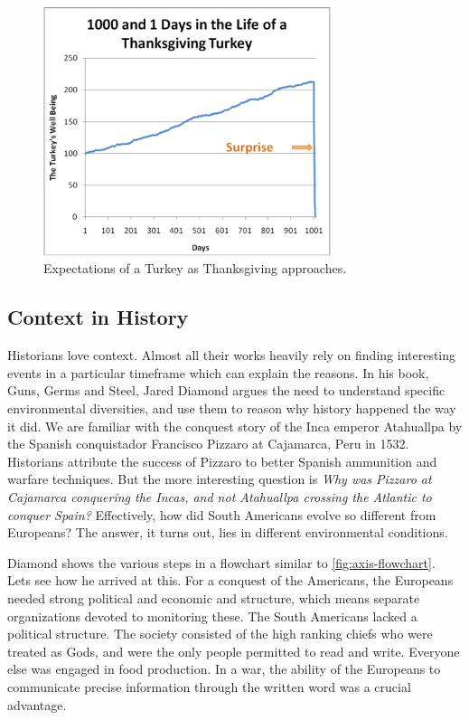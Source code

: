 \begin{figure}[t]
\centering
\includegraphics[width=0.75\textwidth]{media/chapter2/turkey.png}
\caption{Expectations of a Turkey as Thanksgiving approaches.}
\label{fig:turkey}
\end{figure}

\subsection{Context in History}
Historians love context. Almost all their works heavily rely on finding interesting events in a particular timeframe which can explain the reasons. In his book, Guns, Germs and Steel, Jared Diamond argues the need to understand specific environmental diversities, and use them to reason why history happened the way it did. We are familiar with the conquest story of the Inca emperor Atahuallpa by the Spanish conquistador Francisco Pizzaro at Cajamarca, Peru in 1532. Historians attribute the success of Pizzaro to better Spanish ammunition and warfare techniques. But the more interesting question is \textit{Why was Pizzaro at Cajamarca conquering the Incas, and not Atahuallpa crossing the Atlantic to conquer Spain?} Effectively, how did South Americans evolve so different from Europeans? The answer, it turns out, lies in different environmental conditions.

Diamond shows the various steps in a flowchart similar to \ref{fig:axis-flowchart}. Lets see how he arrived at this. For a conquest of the Americans, the Europeans needed strong political and economic and  structure, which means separate organizations devoted to monitoring these. The South Americans lacked a political structure. The society consisted of the high ranking chiefs who were treated as Gods, and were the only people permitted to read and write. Everyone else was engaged in food production. In a war, the ability of the Europeans to communicate precise information through the written word was a crucial advantage.

